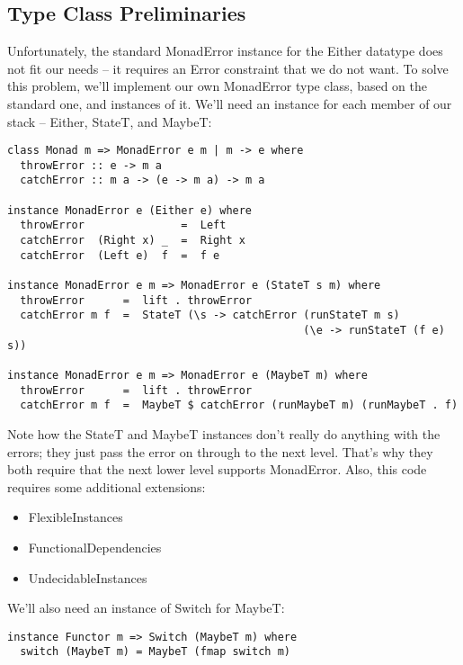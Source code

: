 \documentclass{tmr}
\begin{document}
\subsection{Type Class Preliminaries}
Unfortunately, the standard MonadError instance for the Either datatype does
not fit our needs -- it requires an Error constraint that we do not want.  To
solve this problem, we'll implement our own MonadError type class, based on the
standard one, and instances of it.  We'll need an instance for each member of
our stack -- Either, StateT, and MaybeT: 
\begin{verbatim}
class Monad m => MonadError e m | m -> e where
  throwError :: e -> m a
  catchError :: m a -> (e -> m a) -> m a

instance MonadError e (Either e) where
  throwError               =  Left
  catchError  (Right x) _  =  Right x
  catchError  (Left e)  f  =  f e
  
instance MonadError e m => MonadError e (StateT s m) where
  throwError      =  lift . throwError
  catchError m f  =  StateT (\s -> catchError (runStateT m s) 
                                              (\e -> runStateT (f e) s))

instance MonadError e m => MonadError e (MaybeT m) where
  throwError      =  lift . throwError
  catchError m f  =  MaybeT $ catchError (runMaybeT m) (runMaybeT . f)
\end{verbatim}
Note how the StateT and MaybeT instances don't really do anything with the
errors; they just pass the error on through to the next level.  That's why they
both require that the next lower level supports MonadError.  Also, this code 
requires some additional extensions:
\begin{itemize}
\item FlexibleInstances
\item FunctionalDependencies
\item UndecidableInstances 
\end{itemize}

We'll also need an instance of Switch for MaybeT:
\begin{verbatim}
instance Functor m => Switch (MaybeT m) where
  switch (MaybeT m) = MaybeT (fmap switch m)
\end{verbatim}
\end{document}
